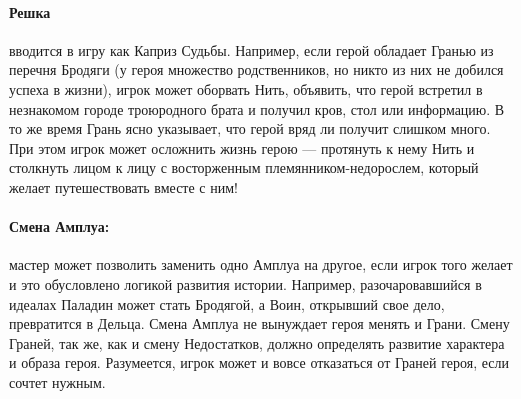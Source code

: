 \paragraph{Решка} вводится в игру как Каприз Судьбы.
Например, если герой обладает Гранью из перечня Бродяги (у героя множество родственников, но никто из них не добился успеха в жизни), игрок может оборвать Нить, объявить, что герой встретил в незнакомом городе троюродного брата и получил кров, стол или информацию. В то же время Грань ясно указывает, что герой вряд ли получит слишком много. При этом игрок может осложнить жизнь герою — протянуть к нему Нить и столкнуть лицом к лицу с восторженным племянником-недорослем, который желает путешествовать вместе с ним!
\paragraph{Смена Амплуа:} мастер может позволить заменить одно Амплуа на другое, если игрок того желает и это обусловлено логикой развития истории. Например, разочаровавшийся в идеалах Паладин может стать Бродягой, а Воин, открывший свое дело, превратится в Дельца. Смена Амплуа не вынуждает героя менять и Грани. Смену Граней, так же, как и смену Недостатков, должно определять развитие характера и образа героя. Разумеется, игрок может и вовсе отказаться от Граней героя, если сочтет нужным.
\newline
{}